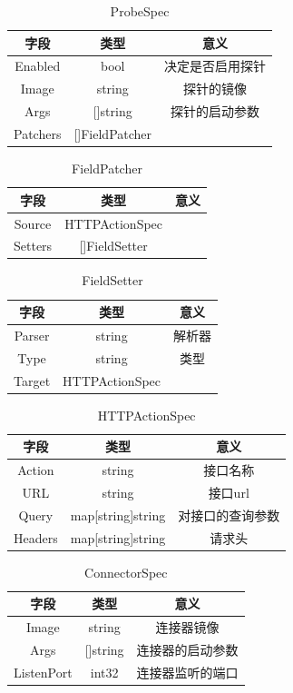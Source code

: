\documentclass[12pt,a4paper]{article}
\theoremstyle{definition}
\begin{document}
\begin{table}[!htbp]
\centering
\begin{tabular}{ccc}
  \toprule
  字段& 类型& 意义\\
  \midrule
  Enabled& bool& 决定是否启用探针\\
  Image& string& 探针的镜像\\
  Args& []string& 探针的启动参数\\
  Patchers& []FieldPatcher& \\
  \bottomrule
\end{tabular}
\caption{ProbeSpec}
\end{table}

\begin{table}[!htbp]
\centering
\begin{tabular}{ccc}
  \toprule
  字段& 类型& 意义\\
  \midrule
  Source& HTTPActionSpec&  \\
  Setters& []FieldSetter&  \\
  \bottomrule
\end{tabular}
\caption{FieldPatcher}
\end{table}

\begin{table}[!htbp]
\centering
\begin{tabular}{ccc}
  \toprule
  字段& 类型& 意义\\
  \midrule
  Parser& string& 解析器\\
  Type& string& 类型\\
  Target& HTTPActionSpec& \\
  \bottomrule
\end{tabular}
\caption{FieldSetter}
\end{table}

\begin{table}[!htbp]
\centering
\begin{tabular}{ccc}
  \toprule
  字段& 类型& 意义\\
  \midrule
  Action& string& 接口名称\\
  URL& string& 接口url\\
  Query& map[string]string& 对接口的查询参数\\
  Headers& map[string]string& 请求头\\
  \bottomrule
\end{tabular}
\caption{HTTPActionSpec}
\end{table}

\begin{table}[!htbp]
\centering
\begin{tabular}{ccc}
  \toprule
  字段& 类型& 意义\\
  \midrule
  Image& string& 连接器镜像\\
  Args& []string& 连接器的启动参数\\
  ListenPort& int32& 连接器监听的端口\\
  \bottomrule
\end{tabular}
\caption{ConnectorSpec}
\end{table}
\end{document}
